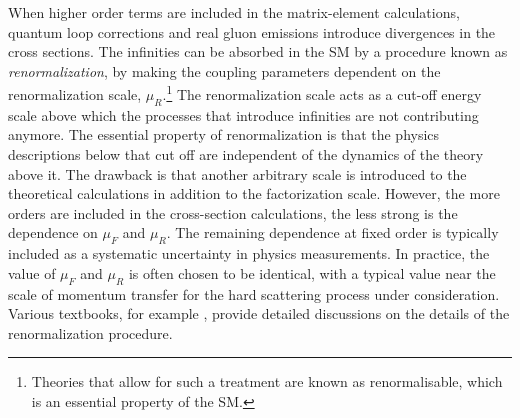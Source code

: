 When higher order terms are included in the matrix-element calculations, quantum loop corrections and real gluon emissions introduce divergences in the cross sections. 
The infinities can be absorbed in the SM by a procedure known as \emph{renormalization}, by making the coupling parameters dependent on the renormalization scale, $\mu_R$.\footnote{Theories that allow for such a treatment are known as renormalisable, which is an essential property of the SM.}
The renormalization scale acts as a cut-off energy scale above which the processes that introduce infinities are not contributing anymore. 
The essential property of renormalization is that the physics descriptions below that cut off are independent of the dynamics of the theory above it. 
The drawback is that another arbitrary scale is introduced to the theoretical calculations in addition to the factorization scale.
However, the more orders are included in the cross-section calculations, the less strong is the dependence on $\mu_F$ and $\mu_R$. 
The remaining dependence at fixed order is typically included as a systematic uncertainty in physics measurements.
In practice, the value of $\mu_F$ and $\mu_R$ is often chosen to be identical, with a typical value near the scale of momentum transfer for the hard scattering process under consideration.
Various textbooks, for example , provide detailed discussions on the details of the renormalization procedure.

